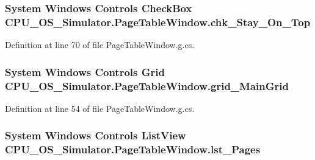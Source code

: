 \subsubsection[{chk\+\_\+\+Stay\+\_\+\+On\+\_\+\+Top}]{\setlength{\rightskip}{0pt plus 5cm}System Windows Controls Check\+Box C\+P\+U\+\_\+\+O\+S\+\_\+\+Simulator.\+Page\+Table\+Window.\+chk\+\_\+\+Stay\+\_\+\+On\+\_\+\+Top\hspace{0.3cm}{\ttfamily [package]}}\label{class_c_p_u___o_s___simulator_1_1_page_table_window_ab0e68128fbf4eb0e840d0d6179517e0f}


Definition at line 70 of file Page\+Table\+Window.\+g.\+cs.

\hypertarget{class_c_p_u___o_s___simulator_1_1_page_table_window_a980885f948a6f104858d19fdf45811b1}{}
\subsubsection[{grid\+\_\+\+Main\+Grid}]{\setlength{\rightskip}{0pt plus 5cm}System Windows Controls Grid C\+P\+U\+\_\+\+O\+S\+\_\+\+Simulator.\+Page\+Table\+Window.\+grid\+\_\+\+Main\+Grid\hspace{0.3cm}{\ttfamily [package]}}\label{class_c_p_u___o_s___simulator_1_1_page_table_window_a980885f948a6f104858d19fdf45811b1}


Definition at line 54 of file Page\+Table\+Window.\+g.\+cs.

\hypertarget{class_c_p_u___o_s___simulator_1_1_page_table_window_ae057c5b521dd61e965fb1cd7643db659}{}
\subsubsection[{lst\+\_\+\+Pages}]{\setlength{\rightskip}{0pt plus 5cm}System Windows Controls List\+View C\+P\+U\+\_\+\+O\+S\+\_\+\+Simulator.\+Page\+Table\+Window.\+lst\+\_\+\+Pages\hspace{0.3cm}{\ttfamily [package]}}\label{class_c_p_u___o_s___simulator_1_1_page_table_window_ae057c5b521dd61e965fb1cd7643db659}


